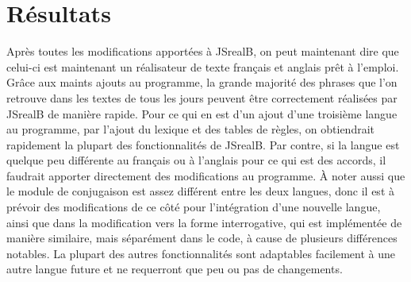 \documentclass[11pt]{article} %
\begin{document}
\section{Résultats}
Après toutes les modifications apportées à JSrealB, on peut maintenant
dire que celui-ci est maintenant un réalisateur de texte français et anglais
prêt à l'emploi. Grâce aux maints ajouts au programme, la grande majorité
des phrases que l'on retrouve dans les textes de tous les jours peuvent
être correctement réalisées par JSrealB de manière rapide. Pour ce
qui en est d'un ajout d'une troisième langue au programme, par l'ajout
du lexique et des tables de règles, on obtiendrait rapidement la plupart
des fonctionnalités de JSrealB. Par contre, si la langue est quelque
peu différente au français ou à l'anglais pour ce qui est des accords,
il faudrait apporter directement des modifications au programme. À
noter aussi que le module de conjugaison est assez différent entre
les deux langues, donc il est à prévoir des modifications de ce côté
pour l'intégration d'une nouvelle langue, ainsi que dans la modification
vers la forme interrogative, qui est implémentée de manière similaire,
mais séparément dans le code, à cause de plusieurs différences notables.
La plupart des autres fonctionnalités sont adaptables facilement à
une autre langue future et ne requerront que peu ou pas de changements.
\end{document}

